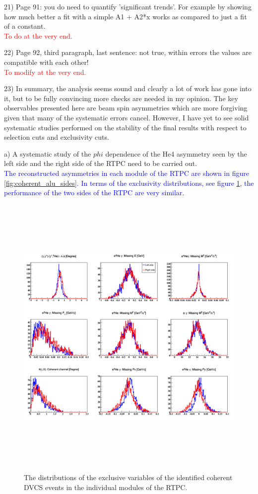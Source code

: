 21) Page 91: you do need to quantify 'significant trends'. For example by 
showing how much better a fit with a simple A1 + A2*x works as compared to just 
a fit of a constant.\\
\textcolor{red}{To do at the very end.}

22) Page 92, third paragraph, last sentence: not true, within errors the values 
are compatible with each other!\\
\textcolor{red}{To modify at the very end.}

23) In summary, the analysis seems sound and clearly a lot of work has gone 
into it, but to be fully convincing more checks are needed in my opinion.  The 
key observables presented here are beam spin asymmetries which are more 
forgiving given that many of the systematic errors cancel.  However, I have yet 
to see solid systematic studies performed on the stability of the final results 
with respect to selection cuts and exclusivity cuts. 
 
 a) A systematic study of the $phi$ dependence of the He4 asymmetry seen by the 
 left side and the right side of the RTPC need to be carried out.\\
\textcolor{blue}{ The reconstructed asymmetries in each module of the RTPC are 
shown in figure \ref{fig:coherent_alu_sides}. In terms of the exclusivity 
distributions, see figure \ref{fig:sides_rtpc_exclusivity}, the performance of 
the two sides of the RTPC are very similar.}\\

\begin{figure}[tbp]
   \centering 
\includegraphics[height=14.2cm]{fig/all_coh_exc_cuts_final_sides.png} 
\caption{The distributions of the exclusive variables of the identified 
coherent DVCS events in the individual modules of the RTPC.}                                    
\label{fig:sides_rtpc_exclusivity}                                   
\end{figure}



